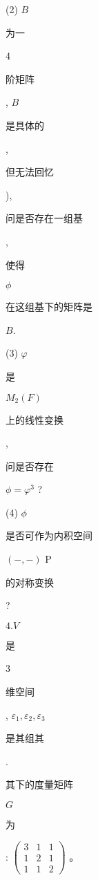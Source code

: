 \documentclass[10pt]{article}
\begin{document}
(2) $B$ \begin{CJK}{UTF8}{mj}为一\end{CJK} 4 \begin{CJK}{UTF8}{mj}阶矩阵\end{CJK}, $B$ \begin{CJK}{UTF8}{mj}是具体的\end{CJK},\begin{CJK}{UTF8}{mj}但无法回忆\end{CJK}), \begin{CJK}{UTF8}{mj}问是否存在一组基\end{CJK}, \begin{CJK}{UTF8}{mj}使得\end{CJK} $\phi$ \begin{CJK}{UTF8}{mj}在这组基下的矩阵是\end{CJK} $B$.

(3) $\varphi$ \begin{CJK}{UTF8}{mj}是\end{CJK} $M_{2}(F)$ \begin{CJK}{UTF8}{mj}上的线性变换\end{CJK}, \begin{CJK}{UTF8}{mj}问是否存在\end{CJK} $\phi=\varphi^{3}$ ?

(4) $\phi$ \begin{CJK}{UTF8}{mj}是否可作为内积空间\end{CJK} $(-,-)$ P\begin{CJK}{UTF8}{mj}的对称变换\end{CJK}?

$4 . V$ \begin{CJK}{UTF8}{mj}是\end{CJK} 3 \begin{CJK}{UTF8}{mj}维空间\end{CJK}, $\varepsilon_{1}, \varepsilon_{2}, \varepsilon_{3}$ \begin{CJK}{UTF8}{mj}是其组其\end{CJK}. \begin{CJK}{UTF8}{mj}其下的度量矩阵\end{CJK} $G$ \begin{CJK}{UTF8}{mj}为\end{CJK}: $\left(\begin{array}{ccc}3 & 1 & 1 \\ 1 & 2 & 1 \\ 1 & 1 & 2\end{array}\right)$ 。
\end{document}
